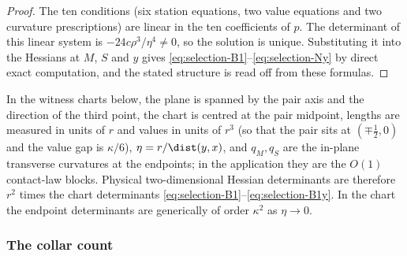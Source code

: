 \begin{proof}
The ten conditions (six station equations, two value equations and two curvature prescriptions) are linear in the ten coefficients of $p$. The determinant of this linear system is $-24c\rho^3/\eta^4\ne0$, so the solution is unique. Substituting it into the Hessians at $M$, $S$ and $y$ gives \eqref{eq:selection-B1}--\eqref{eq:selection-Ny} by direct exact computation, and the stated structure is read off from these formulas.
\end{proof}

In the witness charts below, the plane is spanned by the pair axis and the direction of the third point, the chart is centred at the pair midpoint, lengths are measured in units of $r$ and values in units of $r^3$ (so that the pair sits at $(\mp\frac12,0)$ and the value gap is $\kappa/6$), $\eta=r/\dist(y,x)$, and $q_M,q_S$ are the in-plane transverse curvatures at the endpoints; in the application they are the $O(1)$ contact-law blocks. Physical two-dimensional Hessian determinants are therefore $r^2$ times the chart determinants \eqref{eq:selection-B1}--\eqref{eq:selection-B1y}. In the chart the endpoint determinants are generically of order $\kappa^2$ as $\eta\to0$.

\subsubsection{The collar count}

